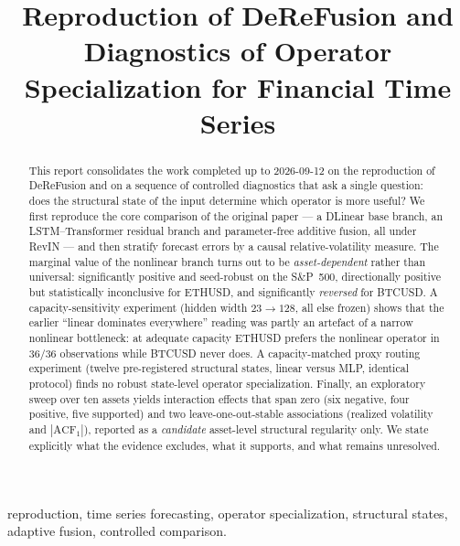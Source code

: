 \documentclass[conference]{IEEEtran}
\begin{document}
\title{Reproduction of DeReFusion and Diagnostics of Operator\\ Specialization for Financial Time Series}

\author{
}

\maketitle

\begin{abstract}
This report consolidates the work completed up to 2026-09-12 on the reproduction of
DeReFusion and on a sequence of controlled diagnostics that ask a single question: does the
structural state of the input determine which operator is more useful? We first reproduce the
core comparison of the original paper --- a DLinear base branch, an LSTM--Transformer residual
branch and parameter-free additive fusion, all under RevIN --- and then stratify forecast errors
by a causal relative-volatility measure. The marginal value of the nonlinear branch turns out to
be \emph{asset-dependent} rather than universal: significantly positive and seed-robust on the
S\&P~500, directionally positive but statistically inconclusive for ETHUSD, and significantly
\emph{reversed} for BTCUSD. A capacity-sensitivity experiment (hidden width $23\!\to\!128$, all
else frozen) shows that the earlier ``linear dominates everywhere'' reading was partly an artefact
of a narrow nonlinear bottleneck: at adequate capacity ETHUSD prefers the nonlinear operator in
$36/36$ observations while BTCUSD never does. A capacity-matched proxy routing experiment (twelve
pre-registered structural states, linear versus MLP, identical protocol) finds no robust
state-level operator specialization. Finally, an exploratory sweep over ten assets yields
interaction effects that span zero (six negative, four positive, five supported) and two
leave-one-out-stable associations (realized volatility and $|\mathrm{ACF}_1|$), reported as a
\emph{candidate} asset-level structural regularity only. We state explicitly what the evidence
excludes, what it supports, and what remains unresolved.
\end{abstract}

\begin{IEEEkeywords}
reproduction, time series forecasting, operator specialization, structural states,
adaptive fusion, controlled comparison.
\end{IEEEkeywords}
\end{document}
